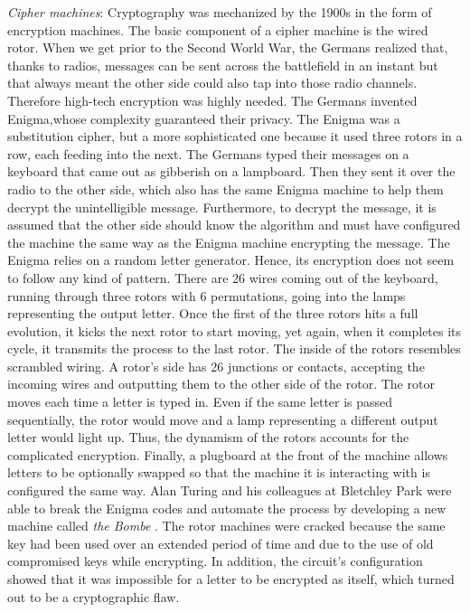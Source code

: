 \textit{Cipher machines}: Cryptography was mechanized by the 1900s in the form of encryption machines. The basic component of a cipher machine is the wired rotor. When we get prior to the Second World War, the Germans realized that, thanks to radios, messages can be sent across the battlefield in an instant but that always meant the other side could also tap into those radio channels. Therefore high-tech encryption was highly needed. The Germans invented Enigma,whose complexity guaranteed their privacy. The Enigma was a substitution cipher, but a more sophisticated one because it used three rotors in a row, each feeding into the next. The Germans typed their messages on a keyboard that came out as gibberish on a lampboard. Then they sent it over the radio to the other side, which also has the same Enigma machine to help them decrypt the unintelligible message. Furthermore, to decrypt the message, it is assumed that the other side should know the algorithm and must have configured the machine the same way as the Enigma machine encrypting the message. The Enigma relies on a random letter generator. Hence, its encryption does not seem to follow any kind of pattern. There are 26 wires coming out of the keyboard, running through three rotors with 6 permutations, going into the lamps representing the output letter. Once the first of the three rotors hits a full evolution, it kicks the next rotor to start moving, yet again, when it completes its cycle, it transmits the process to the last rotor. The inside of the rotors resembles scrambled wiring. A rotor's side has 26 junctions or contacts, accepting the incoming wires and outputting them to the other side of the rotor. The rotor moves each time a letter is typed in. Even if the same letter is passed sequentially, the rotor would move and a lamp representing a different output letter would light up. Thus, the dynamism of the rotors accounts for the complicated encryption. Finally, a plugboard at the front of the machine allows letters to be optionally swapped so that the machine it is interacting with is configured the same way. Alan Turing and his colleagues at Bletchley Park were able to break the Enigma codes and automate the process by developing a new machine called \textit{the Bombe} \cite{alanturing}. The rotor machines were cracked because the same key had been used over an extended period of time and due to the use of old compromised keys while encrypting. In addition, the circuit's configuration showed that it was impossible for a letter to be encrypted as itself, which turned out to be a cryptographic flaw. 

